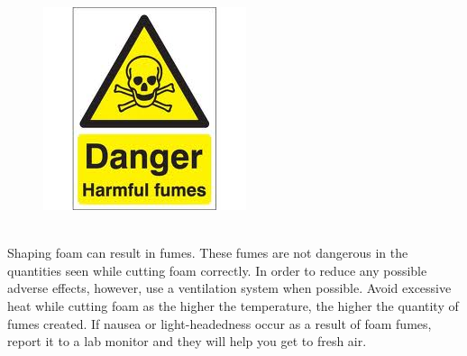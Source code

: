 \begin{framed}
\begin{figure}
\includegraphics[width=\linewidth]{images/fumes_hazard.jpg}
\end{figure}
\ \\
Shaping foam can result in fumes. These fumes are not dangerous in the quantities seen while cutting foam correctly. In order to reduce any possible adverse effects, however, use a ventilation system when possible. Avoid excessive heat while cutting foam as the higher the temperature, the higher the quantity of fumes created. If nausea or light-headedness occur as a result of foam fumes, report it to a lab monitor and they will help you get to fresh air.
\end{framed}

